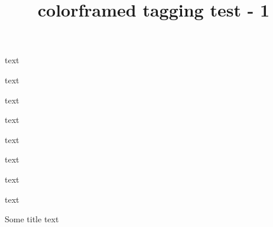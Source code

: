 \documentclass{article}
\title{colorframed tagging test - 1}
\begin{document}
text

\begin{framed}
text
\end{framed}

\begin{oframed}
text
\end{oframed}

\begin{shaded}
text
\end{shaded}

\begin{shaded*}
text
\end{shaded*}

\begin{leftbar}
text
\end{leftbar}

\begin{snugshade}
text
\end{snugshade}

\begin{snugshade*}
text
\end{snugshade*}

\begin{titled-frame}{Some title}
text
\end{titled-frame}
\end{document}
